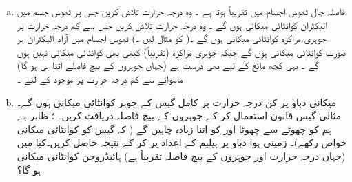 \begin{enumerate}[a.]
\item
{}\quad
  فاصلہ جال  ٹھوس اجسام میں   تقریباً  ہوتا ہے ۔ وہ درجہ حرارت تلاش کریں  جس پر  ٹھوس جسم میں    الیکٹران  کوانٹائی میکانی  ہوں گے ۔ وہ درجہ حرارت تلاش کریں جس سے کم درجہ حرارت پر  جوہری مراکزہ  کوانٹائی میکانی  ہوں گے ۔( کو   مثال  لیں ۔) \quad 
ٹھوس اجسام میں آزاد  الیکٹران ہر صورت کوانٹائی میکانی ہوں گے  جبکہ جوہری  مراکزہ (تقریباً) کبھی بھی کوانٹائی میکانی نہیں ہوں گے ۔ یہی  کچھ  مائع  کے لیے بھی درست ہے (جہاں جوہروں  کے بیچ فاصلے اتنا ہی ہو گا)   ماسوائے   سے کم درجہ حرارت پر موجود  کے  لئے ۔
\item
{} میکانی دباو  پر کن  درجہ حرارت پر کامل گیس کے جوہر کوانٹائی میکانی ہوں گے۔     \quad
مثالی گیس  قانون   استعمال کر کے  جوہروں کے بیچ فاصلہ دریافت کریں۔ \quad
{}  ؛  ظاہر ہے  ہم  کو چھوٹے سے چھوٹا  اور  کو اتنا  زیادہ چاہیں گے (  کہ  گیس کو کوانٹائی میکانی خواص رکھے)۔  زمینی ہوا  دباو پر ہیلیم  کے اعداد پر کر کے نتیجہ حاصل کریں۔کیا    میں (جہاں درجہ حرارت  اور جوہروں کے بیچ فاصلہ تقریباً    ہے)  ہائیڈروجن  کوانٹائی میکانی ہو گا؟  
\end{enumerate}
